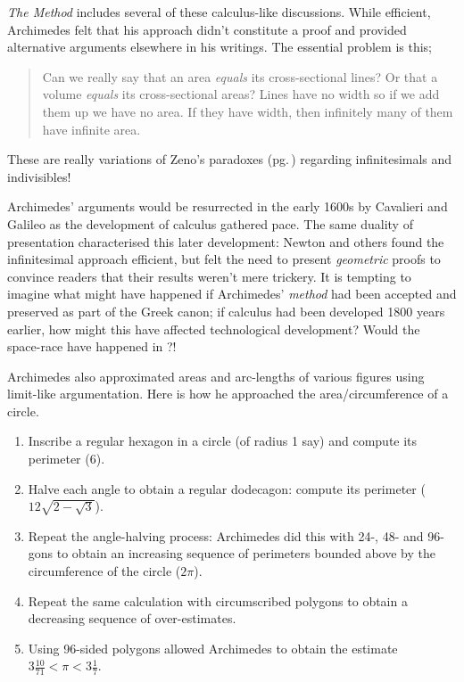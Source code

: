 \emph{The Method} includes several of these calculus-like discussions. While efficient, Archimedes felt that his approach didn't constitute a proof and provided alternative arguments elsewhere in his writings. The essential problem is this;
\begin{quote}
  Can we really say that an area \emph{equals} its cross-sectional lines? Or that a volume \emph{equals} its cross-sectional areas? Lines have no width so if we add them up we have no area. If they have width, then infinitely many of them have infinite area.
\end{quote}
These are really variations of Zeno's paradoxes (pg.\,\pageref{pg:zeno}) regarding infinitesimals and indivisibles!
\goodbreak

Archimedes' arguments would be resurrected in the early 1600s by Cavalieri and Galileo as the development of calculus gathered pace. The same duality of presentation characterised this later development: Newton and others found the infinitesimal approach efficient, but felt the need to present \emph{geometric} proofs to convince readers that their results weren't mere trickery.\smallbreak
It is tempting to imagine what might have happened if Archimedes' \emph{method} had been accepted and preserved as part of the Greek canon; if calculus had been developed 1800 years earlier, how might this have affected technological development? Would the space-race have happened in ?!


 Archimedes also approximated areas and arc-lengths of various figures using limit-like argumentation. Here is how he approached the area/circumference of a circle.\label{pg:archquadcircle}

\begin{enumerate}\itemsep0pt
  \item Inscribe a regular hexagon in a circle (of radius 1 say) and compute its perimeter ($6$).
  \item Halve each angle to obtain a regular dodecagon: compute its perimeter ($12\sqrt{2-\sqrt 3}$).
  \item Repeat the angle-halving process: Archimedes did this with 24-, 48- and 96-gons to obtain an increasing sequence of perimeters bounded above by the circumference of the circle ($2\pi$).
  \item Repeat the same calculation with circumscribed polygons to obtain a decreasing sequence of over-estimates.
  \item Using 96-sided polygons allowed Archimedes to obtain the estimate $3\frac{10}{71}<\pi<3\frac 17$.
\end{enumerate}


